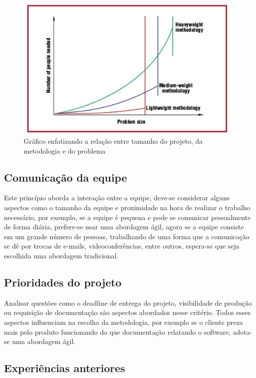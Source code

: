 \begin{figure}[!htpb]
\centering
\includegraphics[scale=0.8]{figuras/abordagem/cockburngraph}
\caption{Gráfico enfatizando a relação entre tamanho do projeto, da metodologia e do problema}
\end{figure}

\subsection{Comunicação da equipe}

    Este princípio aborda a interação entre a equipe, deve-se considerar alguns aspectos como o tamanho da equipe e proximidade na hora de realizar o trabalho necessário, por exemplo, se a equipe é pequena e pode se comunicar pessoalmente de forma diária, prefere-se usar uma abordagem ágil, agora se a equipe consiste em um grande número de pessoas, trabalhando de uma forma que a comunicação se dê por trocas de e-mails, videoconferências, entre outros, espera-se que seja escolhida uma abordagem tradicional.

\subsection{Prioridades do projeto}
Analisar questões como o deadline de entrega do projeto, visibilidade de produção ou requisição de documentação são aspectos abordados nesse critério. Todos esses aspectos influenciam na escolha da metodologia, por exemplo se o cliente preza mais pelo produto funcionando do que documentação relatando o software, adota-se uma abordagem ágil.

\subsection{Experiências anteriores}

